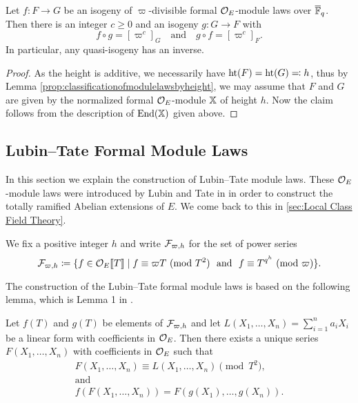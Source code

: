 \documentclass[../main.tex]{subfiles}
\begin{document}
\begin{lem}\label{lem:inverseqisog}
  Let $f\colon  F \to G$ be an isogeny of $\varpi$-divisible formal
  $\mathcal{O}_E$-module laws over ${\overline {\mathbb{F}}_q}$. Then there is an 
  integer $c \geq 0$ and an isogeny $g\colon  G \to F$ with 
  \begin{equation*}
    f \circ g = [\varpi^c]_G \quad \text{and} \quad g \circ f = [\varpi^c]_F.
  \end{equation*}
  In particular, any quasi-isogeny has an inverse. 
  \begin{proof}[Proof]
    As the height is additive, we necessarily have 
    $\textnormal{ht}(F) = \textnormal{ht}(G) \eqcolon h$, thus by Lemma
    \ref{prop:classificationofmodulelawsbyheight}, we may assume that $F$ and
    $G$ are given by the normalized formal $\mathcal{O}_E$-module
    $\mathbb{X}$ of height $h$. Now the claim follows from the description of 
    $\operatorname{End}(\mathbb{X})$ given above. 
  \end{proof}
\end{lem}


\subsection{Lubin--Tate Formal Module Laws} %
\label{sub:Lubin--Tate Formal Module Laws}
In this section we explain the construction
of Lubin--Tate module laws. These $\mathcal{O}_E$-module laws were introduced by 
Lubin and Tate in \cite{LubinTateFormalMult} in order to
construct the totally ramified Abelian extensions of $E$. We come back to this
in \cref{sec:Local Class Field Theory}.

We fix a positive integer $h$ and write $\mathcal{F}_{\varpi,h}$ for the set of power series
\begin{equation*}
  \cF_{\varpi,h} \coloneqq \{f \in \cO_E \llbr T \rrbr \mid f \equiv \varpi T
    \ (\text{mod } {T^2}) \ \text{ and } \ 
    f \equiv T^{q^h} \ (\text{mod }\varpi)\}. 
\end{equation*}

The construction of the Lubin--Tate formal module laws is based on the following 
lemma, which is Lemma 1 in \cite{LubinTateFormalMult}.
\begin{lem}\label{lem:LTLemma1}
  Let $f(T)$ and $g(T)$ be elements of $\mathcal{F}_{\varpi,h}$ and let 
  $L(X_1, \dots, X_n) = \sum_{i=1}^n a_i X_i$ be a linear form with coefficients in 
  ${\mathcal{O}_E}$. Then there exists a unique series $F(X_1, \dots, X_n)$ with coefficients 
  in ${\mathcal{O}_E}$ such that 
  \begin{gather*}
    F(X_1, \dots, X_n) \equiv L(X_1, \dots, X_n) \pmod {T^2}, \\ \text{and} \\
    f(F(X_1, \dots, X_n)) = F(g(X_1), \dots, g(X_n)).
  \end{gather*}
\end{lem}
\end{document}
